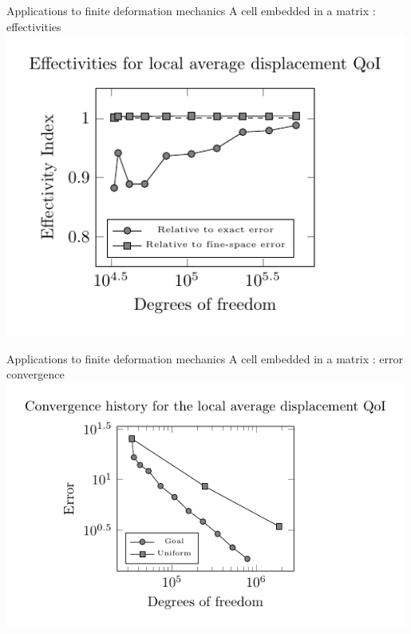 \documentclass[fleqn]{beamer}
\begin{document}

\begin{frame}{Applications to finite deformation mechanics}
{A cell embedded in a matrix : effectivities}
\includegraphics[width=0.99\textwidth]{../img/mech_glial_effectivity_plot}
\end{frame}

\begin{frame}{Applications to finite deformation mechanics}
{A cell embedded in a matrix : error convergence}
\includegraphics[width=0.99\textwidth]{../img/mech_glial_convergence_plot}
\end{frame}

\end{document}
